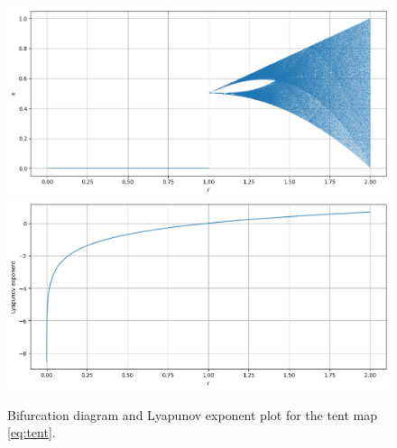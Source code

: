 \begin{exmp}
    \begin{figure}
        \centering
        \includegraphics[width=\linewidth]{Bifurcation Images/bifurcation_tent.png}
        \includegraphics[width=\linewidth]{Bifurcation Images/lypaunov_tent.png}
        \caption{Bifurcation diagram and Lyapunov exponent plot for the tent map \eqref{eq:tent}.}
        \label{fig:lyapunov_tent}
    \end{figure}
\end{exmp}

